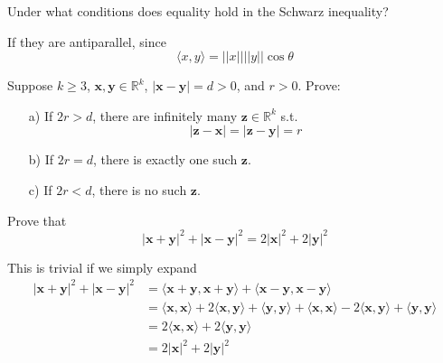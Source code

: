 \documentclass{article}
\begin{document}
    \begin{exercise}[Rudin 1.15]
    Under what conditions does equality hold in the Schwarz inequality? 
    \end{exercise}
    \begin{solution}
    If they are antiparallel, since 
    \[\langle x, y \rangle = ||x || ||y || \cos{\theta}\]
    \end{solution}

    \begin{exercise}[Rudin 1.16]
    Suppose $k \geq 3$, $\mathbf{x}, \mathbf{y} \in \mathbb{R}^k$, $|\mathbf{x} - \mathbf{y}| = d > 0$, and $r > 0$. Prove: 
    \begin{enumerate}
        \item[a)] If $2r > d$, there are infinitely many $\mathbf{z} \in \mathbb{R}^k$ s.t. 
        \[|\mathbf{z} - \mathbf{x}| = |\mathbf{z} - \mathbf{y}| = r\]
        \item[b)] If $2r = d$, there is exactly one such $\mathbf{z}$. 
        \item[c)] If $2r < d$, there is no such $\mathbf{z}$. 
    \end{enumerate}
    \end{exercise}

    \begin{exercise}[Rudin 1.17]
    Prove that
    \[|\mathbf{x} + \mathbf{y}|^2 + |\mathbf{x} - \mathbf{y}|^2 = 2|\mathbf{x}|^2 + 2|\mathbf{y}|^2\]
    \end{exercise}
    \begin{solution}
    This is trivial if we simply expand 
    \begin{align*}
        |\mathbf{x} + \mathbf{y}|^2 + |\mathbf{x} - \mathbf{y}|^2 & = \langle \mathbf{x} + \mathbf{y}, \mathbf{x} + \mathbf{y} \rangle + \langle \mathbf{x} - \mathbf{y}, \mathbf{x} - \mathbf{y} \rangle \\
        & = \langle \mathbf{x}, \mathbf{x} \rangle + 2 \langle \mathbf{x}, \mathbf{y} \rangle + \langle \mathbf{y}, \mathbf{y} \rangle + \langle \mathbf{x}, \mathbf{x} \rangle - 2 \langle \mathbf{x}, \mathbf{y} \rangle + \langle \mathbf{y}, \mathbf{y} \rangle \\
        & = 2 \langle \mathbf{x}, \mathbf{x} \rangle + 2 \langle \mathbf{y}, \mathbf{y} \rangle \\
        & = 2|\mathbf{x}|^2 + 2|\mathbf{y}|^2
    \end{align*}
    \end{solution}
\end{document}
